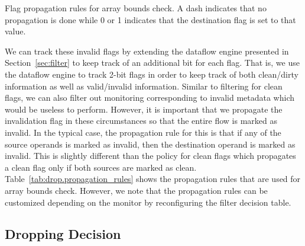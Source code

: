 \begin{table}[tb]
  \begin{center}
    \begin{small}
    
    \end{small}
    \caption{Flag propagation rules for array bounds check. A dash indicates that no
    propagation is done while 0 or 1 indicates that the destination flag is set
    to that value.}
    \label{tab:drop.propagation_rules}
    \vspace{-0.2in}
  \end{center}
\end{table}

We can track these invalid flags by extending the dataflow engine presented in
Section~\ref{sec:filter} to keep track of an additional bit for each flag. That
is, we use the dataflow engine to track 2-bit flags in order to keep track of
both clean/dirty information as well as valid/invalid information.
Similar to filtering for clean flags, we can also filter out
monitoring corresponding to invalid metadata which would be useless to perform.
However, it is important that we propagate the
invalidation flag in these circumstances so that the entire flow is marked as invalid. 
In the typical case, the propagation rule for this is
that if any of the source operands is marked as invalid, then the destination
operand is marked as invalid. This is slightly different than the
policy for clean flags which propagates a clean flag only if both
sources are marked as clean. Table~\ref{tab:drop.propagation_rules} shows the
propagation rules that are used for array bounds check. However, we note that
the propagation rules can be customized depending on the monitor by
reconfiguring the filter decision table.

\subsection{Dropping Decision}
\label{sec:drop.policies}

